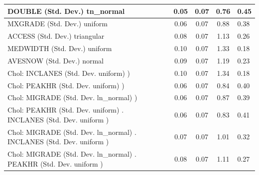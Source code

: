 \begin{table}
\begin{center}
\begin{tabular}{|l|l|c|c|c|l|}
			\hline
			DOUBLE (Std. Dev.) tn_normal &  & 0.05 & 0.07 & 0.76 & 0.45 \\
			\hline
			MXGRADE (Std. Dev.) uniform &  & 0.06 & 0.07 & 0.88 & 0.38 \\
			\hline
			ACCESS (Std. Dev.) triangular &  & 0.08 & 0.07 & 1.13 & 0.26 \\
			\hline
			MEDWIDTH (Std. Dev.) uniform &  & 0.10 & 0.07 & 1.33 & 0.18 \\
			\hline
			AVESNOW (Std. Dev.) normal &  & 0.09 & 0.07 & 1.19 & 0.23 \\
			\hline
			 Chol: INCLANES (Std. Dev. uniform) ) &  & 0.10 & 0.07 & 1.34 & 0.18 \\
			\hline
			 Chol: PEAKHR (Std. Dev. uniform) ) &  & 0.06 & 0.07 & 0.84 & 0.40 \\
			\hline
			 Chol: MIGRADE (Std. Dev. ln_normal) ) &  & 0.06 & 0.07 & 0.87 & 0.39 \\
			\hline
			 Chol: PEAKHR (Std. Dev. uniform) . INCLANES (Std. Dev.   uniform ) &  & 0.06 & 0.07 & 0.83 & 0.41 \\
			\hline
			 Chol: MIGRADE (Std. Dev. ln_normal) . INCLANES (Std. Dev.   uniform ) &  & 0.07 & 0.07 & 1.01 & 0.32 \\
			\hline
			 Chol: MIGRADE (Std. Dev. ln_normal) . PEAKHR (Std. Dev.   uniform ) &  & 0.08 & 0.07 & 1.11 & 0.27 \\
			\hline
		\end{tabular}
	\end{center}
\end{table}